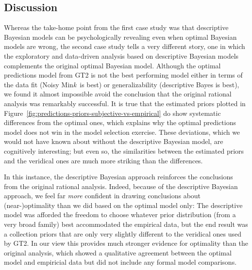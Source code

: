 \documentclass[doc,floatsintext]{apa6}
\newcommand{\mink}{{Min\textit{k}\ }}
\begin{document}
\subsection*{Discussion}

Whereas the take-home point from the first case study was that descriptive Bayesian models can be psychologically revealing even when optimal Bayesian models are wrong, the second case study tells a very different story, one in which the exploratory and data-driven analysis based on descriptive Bayesian models complements the original optimal Bayesian model.  Although the optimal predictions model from GT2 is not the best performing model either in terms of the data fit (Noisy \mink is best) or generalizability (descriptive Bayes is best), we found it almost impossible avoid the conclusion that the original rational analysis was remarkably successful.  It is true that the estimated priors plotted in Figure~\ref{fig:predictions-priors-subjective-vs-empirical} do show systematic differences from the optimal ones, which explains why the optimal predictions model does not win in the model selection exercise. These deviations, which we would not have known about without the descriptive Bayesian model, are cognitively interesting; but even so, the similarities between the estimated priors and the veridical ones are much more striking than the differences.

In this instance, the descriptive Bayesian approach reinforces the conclusions from the original rational analysis. Indeed, because of the descriptive Bayesian approach, we feel far {\it more} confident in drawing conclusions about (near-)optimality than we did based on the optimal model only: The descriptive model was afforded the freedom to choose whatever prior distribution (from a very broad family) best accommodated the empirical data, but the end result was a collection priors that are only very slightly different to the veridical ones used by GT2. In our view this provides much stronger evidence for optimality than the original analysis, which showed a qualitative agreement between the optimal model and empiricial data but did not include any formal model comparisons.
\end{document}
